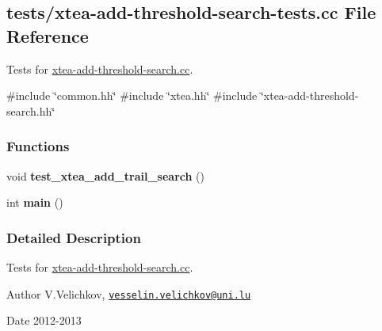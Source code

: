 \hypertarget{xtea-add-threshold-search-tests_8cc}{\subsection{tests/xtea-\/add-\/threshold-\/search-\/tests.cc \-File \-Reference}
\label{xtea-add-threshold-search-tests_8cc}
}


\-Tests for \hyperlink{xtea-add-threshold-search_8cc}{xtea-\/add-\/threshold-\/search.\-cc}.  


{\ttfamily \#include \char`\"{}common.\-hh\char`\"{}}\*
{\ttfamily \#include \char`\"{}xtea.\-hh\char`\"{}}\*
{\ttfamily \#include \char`\"{}xtea-\/add-\/threshold-\/search.\-hh\char`\"{}}\*
\subsubsection*{\-Functions}
\begin{DoxyCompactItemize}
\item 
\hypertarget{xtea-add-threshold-search-tests_8cc_a94d160e2786c16ddde792001cc5b4cc5}{void {\bfseries test\-\_\-xtea\-\_\-add\-\_\-trail\-\_\-search} ()}\label{xtea-add-threshold-search-tests_8cc_a94d160e2786c16ddde792001cc5b4cc5}

\item 
\hypertarget{xtea-add-threshold-search-tests_8cc_ae66f6b31b5ad750f1fe042a706a4e3d4}{int {\bfseries main} ()}\label{xtea-add-threshold-search-tests_8cc_ae66f6b31b5ad750f1fe042a706a4e3d4}

\end{DoxyCompactItemize}


\subsubsection{\-Detailed \-Description}
\-Tests for \hyperlink{xtea-add-threshold-search_8cc}{xtea-\/add-\/threshold-\/search.\-cc}. \begin{DoxyAuthor}{\-Author}
\-V.\-Velichkov, \href{mailto:vesselin.velichkov@uni.lu}{\tt vesselin.\-velichkov@uni.\-lu} 
\end{DoxyAuthor}
\begin{DoxyDate}{\-Date}
2012-\/2013 
\end{DoxyDate}
